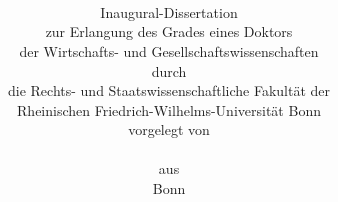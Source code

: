 





\frontmatter  %


\noindent%
\begin{center}
	\begin{minipage}[t][0.99\textheight][t]{0.9\textwidth}
		\title{\sffamily\bfseries\LARGE%
			~\\[-10ex]
			\disstitle%
		}
		\author{\large{}%
		\\[5ex]%
		{\Large Inaugural-Dissertation}%
		\\[2ex]%
		zur Erlangung des Grades eines Doktors \\%
		der Wirtschafts- und Gesellschaftswissenschaften \\[1.25ex]%
		durch \\[1.25ex]%
		die Rechts- und Staatswissenschaftliche Fakultät der \\%
		Rheinischen Friedrich-Wilhelms-Universität Bonn \\[2ex]%
		vorgelegt von \\[3ex]%
		\textbf{%
			{\Large \dissauthor}
		}
		\\[2ex]%
		aus \dissbornin
		\\[8em]%
		Bonn
		}
		\date{{\Large\dissyear}%
		}

		\maketitle
	\end{minipage}
\end{center}

\thispagestyle{bullshitheader}







\newpage
\thispagestyle{empty}

\ifnum {}
	\mbox{\hspace{0pt}}	%
	\vfill

